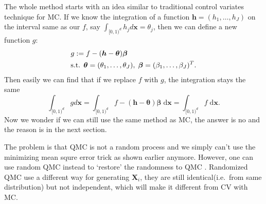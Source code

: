 

The whole method starts with an idea similar to traditional control variates technique for MC.
If we know the integration of a function $\boldsymbol{h}=(h_1,\dots,h_J)$ on the interval same as our $f$, say $\int_{[0,1)^d}h_jd\mathbf{x}=\theta_j$, then we can define a new function $g$:
\begin{align}\label{eq:defg}
    & g:=f-(\boldsymbol{h}-\boldsymbol{\theta})\boldsymbol{\beta}\\
    \notag
    &\text{s.t. }\boldsymbol{\theta}=(\theta_1,\dots,\theta_J),
    \;\boldsymbol{\beta}=(\beta_1,\dots,\beta_J)^T.
\end{align}
Then easily we can find that if we replace $f$ with $g$, the integration stays the same
\[
    \int_{[0,1)^d}gd\mathbf{x}
        =\int_{[0,1)^d}f-(\boldsymbol{h}-\boldsymbol{\theta})\boldsymbol{\beta}\;\textrm{d}\mathbf{x}
            =\int_{[0,1)^d}f\;\textrm{d}\mathbf{x}.
\]
Now we wonder if we can still use the same method as MC, the answer is no and the reason is in the next section. 


The problem is that QMC is not a random process and we simply can't use the minimizing mean squre error trick as shown earlier anymore. However, one can use random QMC instead to `restore' the randomness to QMC \cite{owen2006warnock}. 
Randomized QMC use a different way for generating $\mathbf{X}_i$, they are still identical(i.e.\ from same distribution) but not independent, which will make it different from CV with MC.

